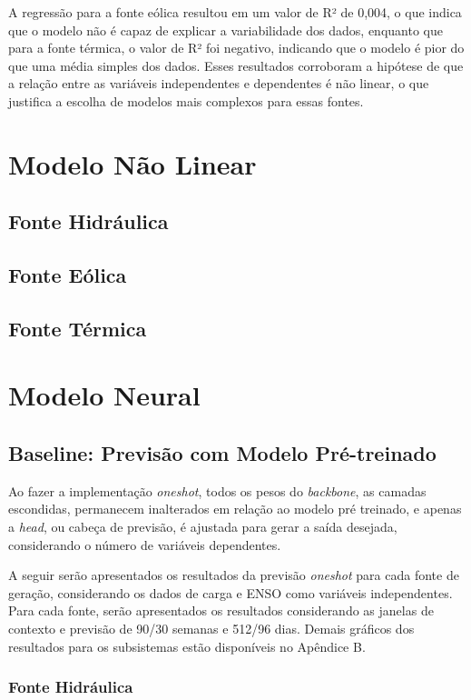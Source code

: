 A regressão para a fonte eólica resultou em um valor de R² de 0,004, o que indica que o modelo não é capaz de explicar a 
variabilidade dos dados, enquanto que para a fonte térmica, o valor de R² foi negativo, indicando que o modelo é pior do 
que uma média simples dos dados. Esses resultados corroboram a hipótese de que a relação entre as variáveis independentes 
e dependentes é não linear, o que justifica a escolha de modelos mais complexos para essas fontes.


\section{Modelo Não Linear}
\subsection{Fonte Hidráulica}
\subsection{Fonte Eólica}
\subsection{Fonte Térmica}


\section{Modelo Neural}
\subsection{Baseline: Previsão com Modelo Pré-treinado}
Ao fazer a implementação \textit{oneshot}, todos os pesos do \textit{backbone}, as camadas escondidas, permanecem inalterados
em relação ao modelo pré treinado, e apenas a \textit{head}, ou cabeça de previsão, é ajustada para gerar a saída desejada,
considerando o número de variáveis dependentes.

A seguir serão apresentados os resultados da previsão \textit{oneshot} para cada fonte de geração, considerando os dados de carga e ENSO
como variáveis independentes. Para cada fonte, serão apresentados os resultados considerando as janelas de contexto e previsão
de 90/30 semanas e 512/96 dias. Demais gráficos dos resultados para os subsistemas estão disponíveis no Apêndice B.

\subsubsection{Fonte Hidráulica}
\begin{figure}[!ht]
  {}
  {}
\end{figure}

